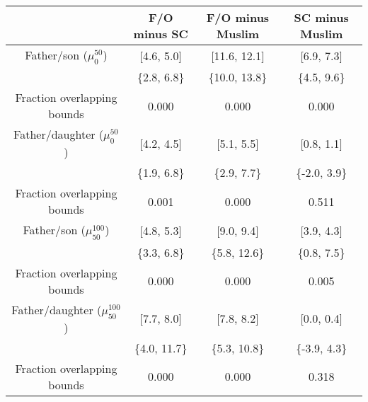 \hline
\hline
\begin{tabular}{cccc} 
& F/O minus SC & F/O minus Muslim & SC minus Muslim \\ 
\hline 
Father/son ($\mu_0^{50}$) & [4.6, 5.0] &
                            [11.6, 12.1] &
                            [6.9, 7.3] \\
& \{2.8, 6.8\} &
  \{10.0, 13.8\} &
  \{4.5, 9.6\} \\
Fraction overlapping bounds & 0.000  & 0.000 & 0.000 \\ 
\hline

Father/daughter ($\mu_0^{50}$) & [4.2, 4.5] &
                                 [5.1, 5.5] &
                                 [0.8, 1.1] \\
& \{1.9, 6.8\} &
  \{2.9, 7.7\} &
  \{-2.0, 3.9\} \\
Fraction overlapping bounds & 0.001  & 0.000 & 0.511 \\ 
\hline

Father/son ($\mu_{50}^{100}$) & [4.8, 5.3] &
                                [9.0, 9.4] &
                                [3.9, 4.3] \\
& \{3.3, 6.8\} &
  \{5.8, 12.6\} &
  \{0.8, 7.5\} \\
Fraction overlapping bounds & 0.000  & 0.000 & 0.005 \\ 
\hline

Father/daughter ($\mu_{50}^{100}$) & [7.7, 8.0] &
                                [7.8, 8.2] &
                                [0.0, 0.4]  \\
 & \{4.0, 11.7\} &
   \{5.3, 10.8\} &
   \{-3.9, 4.3\} \\
Fraction overlapping bounds & 0.000  & 0.000 & 0.318 \\ 
\end{tabular}
\hline
\hline 
